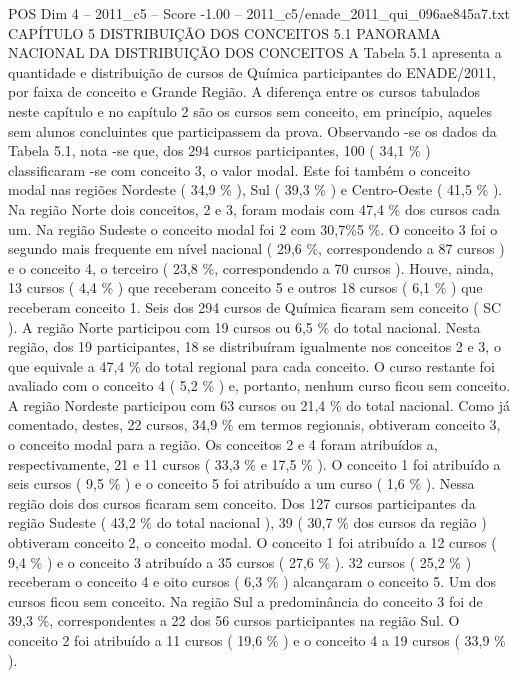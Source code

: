 \begin{textsample}{POS Dim 4 – 2011\_c5 – Score -1.00 – 2011\_c5/enade\_2011\_qui\_096ae845a7.txt}  \label{ex:f4_pos_244}
CAPÍTULO 5 DISTRIBUIÇÃO DOS CONCEITOS 5.1 PANORAMA NACIONAL DA DISTRIBUIÇÃO DOS CONCEITOS A Tabela 5.1 apresenta a quantidade e distribuição de cursos de Química participantes do ENADE/2011, por faixa de conceito e Grande Região.
A diferença entre os cursos tabulados neste capítulo e no capítulo 2 são os cursos sem conceito, em princípio, aqueles sem alunos concluintes que participassem da prova.
Observando -se os dados da Tabela 5.1, nota -se que, dos 294 cursos participantes, 100 ( 34,1 \% ) classificaram -se com conceito 3, o valor modal.
Este foi também o conceito modal nas regiões Nordeste ( 34,9 \% ), Sul ( 39,3 \% ) e Centro-Oeste ( 41,5 \% ).
Na região Norte dois conceitos, 2 e 3, foram modais com 47,4 \% dos cursos cada um.
Na região Sudeste o conceito modal foi 2 com 30,7\%5 \%.
O conceito 3 foi o segundo mais frequente em nível nacional ( 29,6 \%, correspondendo a 87 cursos ) e o conceito 4, o terceiro ( 23,8 \%, correspondendo a 70 cursos ).
Houve, ainda, 13 cursos ( 4,4 \% ) que receberam conceito 5 e outros 18 cursos ( 6,1 \% ) que receberam conceito 1.
Seis dos 294 cursos de Química ficaram sem conceito ( SC ).
A região Norte participou com 19 cursos ou 6,5 \% do total nacional.
Nesta região, dos 19 participantes, 18 se distribuíram igualmente nos conceitos 2 e 3, o que equivale a 47,4 \% do total regional para cada conceito.
O curso restante foi avaliado com o conceito 4 ( 5,2 \% ) e, portanto, nenhum curso ficou sem conceito.
A região Nordeste participou com 63 cursos ou 21,4 \% do total nacional.
Como já comentado, destes, 22 cursos, 34,9 \% em termos regionais, obtiveram conceito 3, o conceito modal para a região.
Os conceitos 2 e 4 foram atribuídos a, respectivamente, 21 e 11 cursos ( 33,3 \% e 17,5 \% ).
O conceito 1 foi atribuído a seis cursos ( 9,5 \% ) e o conceito 5 foi atribuído a um curso ( 1,6 \% ).
Nessa região dois dos cursos ficaram sem conceito.
Dos 127 cursos participantes da região Sudeste ( 43,2 \% do total nacional ), 39 ( 30,7 \% dos cursos da região ) obtiveram conceito 2, o conceito modal.
O conceito 1 foi atribuído a 12 cursos ( 9,4 \% ) e o conceito 3 atribuído a 35 cursos ( 27,6 \% ). 32 cursos ( 25,2 \% ) receberam o conceito 4 e oito cursos ( 6,3 \% ) alcançaram o conceito 5.
Um dos cursos ficou sem conceito.
Na região Sul a predominância do conceito 3 foi de 39,3 \%, correspondentes a 22 dos 56 cursos participantes na região Sul.
O conceito 2 foi atribuído a 11 cursos ( 19,6 \% ) e o conceito 4 a 19 cursos ( 33,9 \% ).

\end{textsample}
